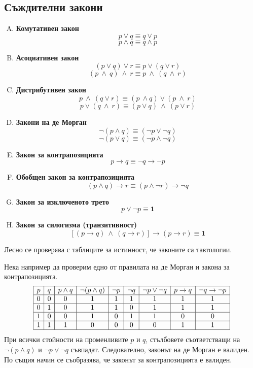 \subsection*{Съждителни закони}

\begin{enumerate}[A)]
  \item
    {\bf Комутативен закон}
    \[p\vee q \equiv q\vee p\] 
    \[p \wedge q \equiv q \wedge p\]
  \item
    {\bf Асоциативен закон}
    \[(p\vee q)\vee r \equiv p\vee(q\vee r)\]
    \[(p\ \wedge\ q)\ \wedge\ r \equiv p\ \wedge\ (q\ \wedge\ r)\]
  \item
    {\bf Дистрибутивен закон}
    \[p\ \wedge\ (q \vee r) \equiv (p\ \wedge q)\vee (p\ \wedge\ r)\]
    \[p\vee (q\ \wedge\ r) \equiv (p\vee q)\ \wedge\ (p\vee r)\]
  \item
    {\bf Закони на де Морган}
    \[\neg(p \wedge q) \equiv (\neg p \vee \neg q)\]
    \[\neg(p\vee q) \equiv (\neg p \wedge \neg q)\]
  \item
    {\bf Закон за контрапозицията}
    \[p\rightarrow q \equiv \neg q \rightarrow \neg p\]
  \item
    {\bf Обобщен закон за контрапозицията}
    \[(p \wedge q)\rightarrow r \equiv (p \wedge \neg r) \rightarrow \neg q\]
  \item
    {\bf Закон за изключеното трето}
    \[p\vee \neg p \equiv {\mathbf 1}\]
  \item
    {\bf Закон за силогизма (транзитивност)}
    \[[(p\rightarrow q)\ \wedge\ (q\rightarrow r)] \rightarrow (p\rightarrow r) \equiv {\mathbf 1}\]
\end{enumerate}

Лесно се проверява с таблиците за истинност, че законите са тавтологии.

\begin{example}
  Нека например да проверим едно от правилата на де Морган и закона
  за контрапозицията.
  \[
  \begin{array}{|c|c|c|c|c|c|c|c|c|}
    \hline
    p & q & p\wedge q & \neg(p\wedge q) & \neg p & \neg q & \neg p \vee \neg q & p \rightarrow q & \neg q \rightarrow \neg p\\
    \hline
    0 & 0 & 0 & 1 & 1 & 1 & 1 & 1 & 1 \\
    \hline
    0 & 1 & 0 & 1 & 1 & 0 & 1 & 1 & 1 \\
    \hline
    1 & 0 & 0 & 1 & 0 & 1 & 1 & 0 & 0 \\
    \hline
    1 & 1 & 1 & 0 & 0 & 0 & 0 & 1 & 1 \\
    \hline
  \end{array}
  \]
  При всички стойности на променливите $p$ и $q$, стълбовете съответстващи на $\neg(p \wedge q)$ и $\neg p \vee \neg q$
  съвпадат. Следователно, законът на де Морган е валиден.
  По същия начин се съобразява, че законът за контрапозицията е валиден.
\end{example}


